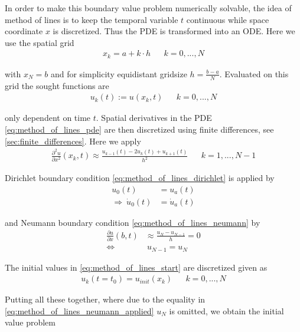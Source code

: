 \documentclass{scrartcl}[12pt, halfparskip]
\numberwithin{equation}{section}
\numberwithin{figure}{section}
\numberwithin{table}{section}
\begin{document}
In order to make this boundary value problem numerically solvable, the idea of method of lines is to keep the temporal variable $t$ continuous while space coordinate $x$ is discretized. Thus the PDE is transformed into an ODE. Here we use the spatial grid
\begin{align}
	x_k = a + k \cdot h & & k=0,...,N
\end{align}

with $x_{N} = b$ and for simplicity equidistant gridsize $h = \frac{b - a}{N}$. Evaluated on this grid the sought functions are
\begin{align}
	u_k(t) := u(x_k,t) & & k=0,...,N
\end{align}

only dependent on time $t$. Spatial derivatives in the PDE \eqref{eq:method_of_lines_pde} are then discretized using finite differences, see \cref{sec:finite_differences}. Here we apply
\begin{align}
	\frac{\partial^2 u}{\partial x^2}(x_k,t) \approx \frac{u_{k-1}(t) - 2 u_k(t) + u_{k+1}(t)}{h^2} & & k=1,...,N-1
	\label{eq:discretized_second_derivative}
\end{align}

Dirichlet boundary condition \cref{eq:method_of_lines_dirichlet} is applied by
\begin{align}
	u_0(t) & = u_a(t) \\
	\Rightarrow \ \dot{u}_0(t) & = \dot{u}_a(t)
\end{align}

and Neumann boundary condition \cref{eq:method_of_lines_neumann} by
\begin{align}
	\frac{\partial u}{\partial x}(b,t) & \approx \frac{u_{N} - u_{N-1}}{h} = 0 \nonumber \\
	\Leftrightarrow & \ u_{N-1} = u_{N} \label{eq:method_of_lines_neumann_applied}
\end{align}

The initial values in \cref{eq:method_of_lines_start} are discretized given as
\begin{align}
	u_k(t=t_0) = u_{init}(x_k) & & k = 0,...,N
\end{align}

Putting all these together, where due to the equality in \cref{eq:method_of_lines_neumann_applied} $u_{N}$ is omitted, we obtain the initial value problem 
\end{document}

